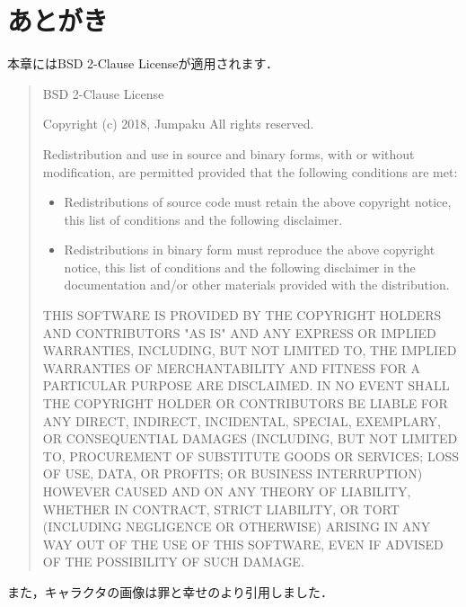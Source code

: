 \section*{あとがき}
本章にはBSD 2-Clause Licenseが適用されます．

\begin{quote}
BSD 2-Clause License

Copyright (c) 2018, Jumpaku
All rights reserved.

Redistribution and use in source and binary forms, with or without
modification, are permitted provided that the following conditions are met:
\begin{itemize}
\item Redistributions of source code must retain the above copyright notice, this
  list of conditions and the following disclaimer.
\item Redistributions in binary form must reproduce the above copyright notice,
  this list of conditions and the following disclaimer in the documentation
  and/or other materials provided with the distribution.
\end{itemize}
THIS SOFTWARE IS PROVIDED BY THE COPYRIGHT HOLDERS AND CONTRIBUTORS "AS IS"
AND ANY EXPRESS OR IMPLIED WARRANTIES, INCLUDING, BUT NOT LIMITED TO, THE
IMPLIED WARRANTIES OF MERCHANTABILITY AND FITNESS FOR A PARTICULAR PURPOSE ARE
DISCLAIMED. IN NO EVENT SHALL THE COPYRIGHT HOLDER OR CONTRIBUTORS BE LIABLE
FOR ANY DIRECT, INDIRECT, INCIDENTAL, SPECIAL, EXEMPLARY, OR CONSEQUENTIAL
DAMAGES (INCLUDING, BUT NOT LIMITED TO, PROCUREMENT OF SUBSTITUTE GOODS OR
SERVICES; LOSS OF USE, DATA, OR PROFITS; OR BUSINESS INTERRUPTION) HOWEVER
CAUSED AND ON ANY THEORY OF LIABILITY, WHETHER IN CONTRACT, STRICT LIABILITY,
OR TORT (INCLUDING NEGLIGENCE OR OTHERWISE) ARISING IN ANY WAY OUT OF THE USE
OF THIS SOFTWARE, EVEN IF ADVISED OF THE POSSIBILITY OF SUCH DAMAGE.
\end{quote}

また，キャラクタの画像は罪と幸せのより引用しました．
